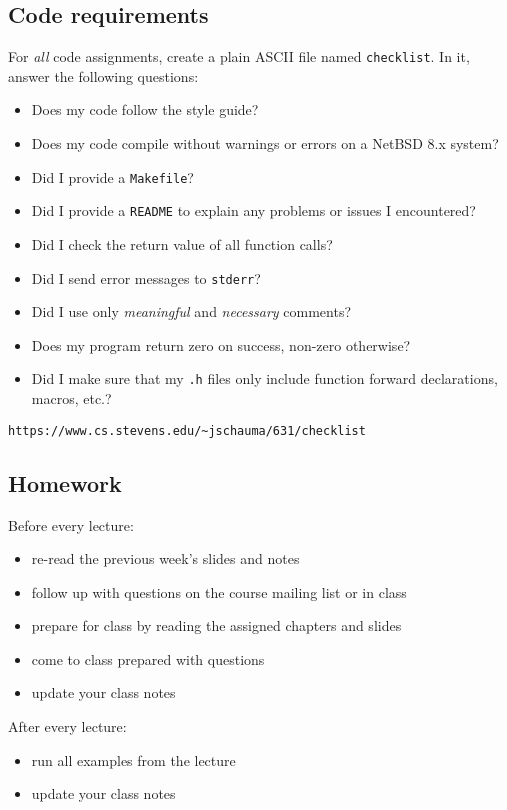 \documentclass[sxga]{xdvislides}
\begin{document}
\subsection{Code requirements}
For {\em all} code assignments, create a plain ASCII file
named {\tt checklist}.  In it, answer the following
questions:
\begin{itemize}
	\item Does my code follow the style guide?
	\item Does my code compile without warnings or errors on a NetBSD 8.x system?
	\item Did I provide a {\tt Makefile}?
	\item Did I provide a {\tt README} to explain any problems or issues I encountered?
	\item Did I check the return value of all function calls?
	\item Did I send error messages to {\tt stderr}?
	\item Did I use only {\em meaningful} and {\em necessary} comments?
	\item Does my program return zero on success, non-zero otherwise?
	\item Did I make sure that my {\tt .h} files only include function forward declarations, macros, etc.?
\end{itemize}

{\tt https://www.cs.stevens.edu/\~{}jschauma/631/checklist}

\subsection{Homework}
Before every lecture:
\begin{itemize}
	\item re-read the previous week's slides and notes
	\item follow up with questions on the course mailing list or in class
	\item prepare for class by reading the assigned chapters and slides
	\item come to class prepared with questions
	\item update your class notes
\end{itemize}
\addvspace{.5in}

After every lecture:
\begin{itemize}
	\item run all examples from the lecture
	\item update your class notes
\end{itemize}
\end{document}
